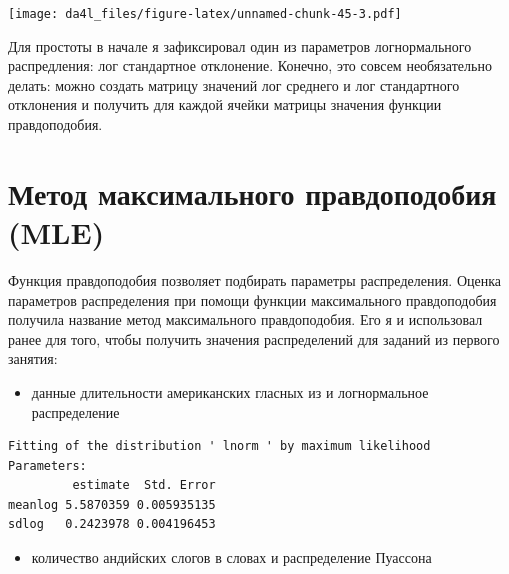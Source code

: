 \documentclass[
]{book}
\newenvironment{Shaded}{\begin{snugshade}}{\end{snugshade}}
\newcommand{\AttributeTok}[1]{\textcolor[rgb]{0.77,0.63,0.00}{#1}}
\newcommand{\FunctionTok}[1]{\textcolor[rgb]{0.00,0.00,0.00}{#1}}
\newcommand{\NormalTok}[1]{#1}
\newcommand{\SpecialCharTok}[1]{\textcolor[rgb]{0.00,0.00,0.00}{#1}}
\newcommand{\StringTok}[1]{\textcolor[rgb]{0.31,0.60,0.02}{#1}}
\providecommand{\tightlist}{%
  \setlength{\itemsep}{0pt}\setlength{\parskip}{0pt}}
\begin{document}
\texttt{[image: da4l\_files/figure-latex/unnamed-chunk-45-3.pdf]}

Для простоты в начале я зафиксировал один из параметров логнормального распредления: лог стандартное отклонение. Конечно, это совсем необязательно делать: можно создать матрицу значений лог среднего и лог стандартного отклонения и получить для каждой ячейки матрицы значения функции правдоподобия.

\hypertarget{ux43cux435ux442ux43eux434-ux43cux430ux43aux441ux438ux43cux430ux43bux44cux43dux43eux433ux43e-ux43fux440ux430ux432ux434ux43eux43fux43eux434ux43eux431ux438ux44f-mle}{%
\section{Метод максимального правдоподобия (MLE)}\label{ux43cux435ux442ux43eux434-ux43cux430ux43aux441ux438ux43cux430ux43bux44cux43dux43eux433ux43e-ux43fux440ux430ux432ux434ux43eux43fux43eux434ux43eux431ux438ux44f-mle}}

Функция правдоподобия позволяет подбирать параметры распределения. Оценка параметров распределения при помощи функции максимального правдоподобия получила название метод максимального правдоподобия. Его я и использовал ранее для того, чтобы получить значения распределений для заданий из первого занятия:

\begin{itemize}
\tightlist
\item
  данные длительности американских гласных из \citep{hillenbrand95} и логнормальное распределение
\end{itemize}

\begin{Shaded}
\end{Shaded}

\begin{verbatim}
Fitting of the distribution ' lnorm ' by maximum likelihood 
Parameters:
         estimate  Std. Error
meanlog 5.5870359 0.005935135
sdlog   0.2423978 0.004196453
\end{verbatim}

\begin{itemize}
\tightlist
\item
  количество андийских слогов в словах и распределение Пуассона
\end{itemize}
\end{document}
